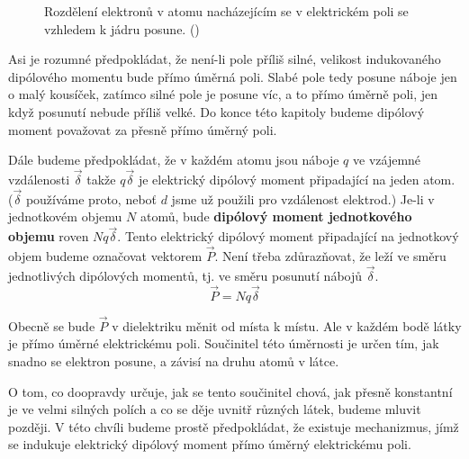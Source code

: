     \begin{figure}[ht!]
      \centering
      \caption{Rozdělení elektronů v atomu nacházejícím se v elektrickém poli se vzhledem k jádru
              posune. (\cite[s.~177]{Feynman02})}
      \label{fyz:fig708}
    \end{figure}

    Asi je rozumné předpokládat, že není-li pole příliš silné, velikost indukovaného dipólového
    momentu bude přímo úměrná poli. Slabé pole tedy posune náboje jen o malý kousíček, zatímco silné
    pole je posune víc, a to přímo úměrně poli, jen když posunutí nebude příliš velké. Do konce této
    kapitoly budeme dipólový moment považovat za přesně přímo úměrný poli.

    Dále budeme předpokládat, že v každém atomu jsou náboje \(q\) ve vzájemné vzdálenosti
    \(\vec{δ}\) takže \(q\vec{δ}\) je elektrický dipólový moment připadající na jeden atom.
    (\(\vec{δ}\) používáme proto, neboť \(d\) jsme už použili pro vzdálenost elektrod.) Je-li v
    jednotkovém objemu \(N\) atomů, bude \textbf{dipólový moment jednotkového objemu} roven
    \(Nq\vec{δ}\). Tento elektrický dipólový moment připadající na jednotkový objem budeme označovat
    vektorem \(\vec{P}\). Není třeba zdůrazňovat, že leží ve směru jednotlivých dipólových momentů,
    tj. ve směru posunutí nábojů \(\vec{δ}\).
    \begin{equation}\label{fyz:eq910}
      \vec{P} = Nq\vec{δ}
    \end{equation}

    Obecně se bude \(\vec{P}\) v dielektriku měnit od místa k místu. Ale v každém bodě látky je
    přímo úměrné elektrickému poli. Součinitel této úměrnosti je určen tím, jak snadno se elektron
    posune, a závisí na druhu atomů v látce.
    
    O tom, co doopravdy určuje, jak se tento součinitel chová, jak přesně konstantní je ve velmi
    silných polích a co se děje uvnitř různých látek, budeme mluvit později. V této chvíli budeme
    prostě předpokládat, že existuje mechanizmus, jímž se indukuje elektrický dipólový moment přímo
    úměrný elektrickému poli.

